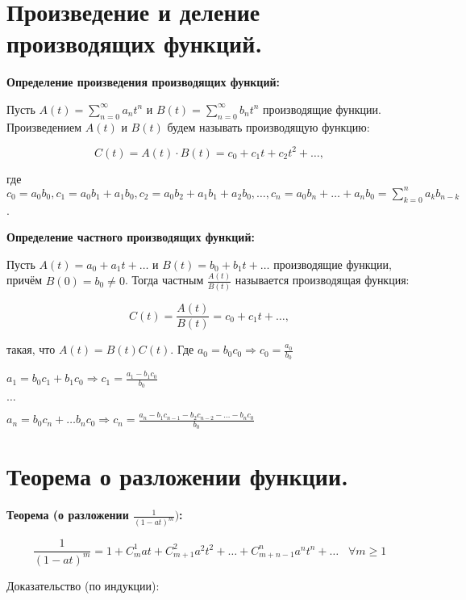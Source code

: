 \section{Произведение и деление производящих функций.}    

\textbf{Определение произведения производящих функций:}
    \smallskip

    Пусть $A(t) = \sum\limits^{\infty}_{n = 0} a_n t^n$ и $B(t) = \sum\limits^{\infty}_{n = 0}
    b_n t^n$ производящие функции. Произведением $A(t)$ и $B(t)$ будем называть
    производящую функцию:

    \[
        C(t) = A(t) \cdot B(t) = c_0 + c_1 t + c_2 t^2 + \dots,  
    \]

    где $c_0 = a_0 b_0, c_1 = a_0 b_1 + a_1 b_0, c_2 = a_0 b_2 + a_1 b_1 + a_2 b_0,
    \dots, c_n = a_0 b_n + \dots + a_n b_0 = \sum\limits^{n}_{k = 0} a_k b_{n - k}$.
    \bigskip

\textbf{Определение частного производящих функций:}
    \smallskip
    
    Пусть $A(t) = a_0 + a_1 t + \dots$ и $B(t) = b_0 + b_1 t + \dots$ производящие
    функции, причём $B(0) = b_0 \neq 0$. Тогда частным $\frac{A(t)}{B(t)}$
    называется производящая функция:

    \[
        C(t) = \frac{A(t)}{B(t)} = c_0 + c_1 t + \dots,  
    \]

    такая, что $A(t) = B(t) C(t)$. Где $a_0 = b_0 c_0 \Rightarrow c_0 = \frac{a_0}{b_0}$

    $a_1 = b_0 c_1 + b_1 c_0 \Rightarrow c_1 = \frac{a_1 - b_1 c_0}{b_0}$

    $\dots$

    $a_n = b_0 c_n + \dots b_n c_0 \Rightarrow c_n = \frac{a_n - b_1 c_{n - 1} - b_2
    c_{n - 2} - \dots - b_n c_0}{b_0}$

\section{Теорема о разложении функции.}

\textbf{Теорема (о разложении $\frac{1}{(1 - at)^m})$:}
    \smallskip

    \[
        \frac{1}{(1 - at)^m} = 1 + C^1_m a t + C^2_{m + 1} a^2 t^2 + \dots +
        C^n_{m + n - 1} a^n t^n + \dots \;\;\; \forall m \geq 1  
    \]
    \bigskip

    Доказательство (по индукции):
    \bigskip

